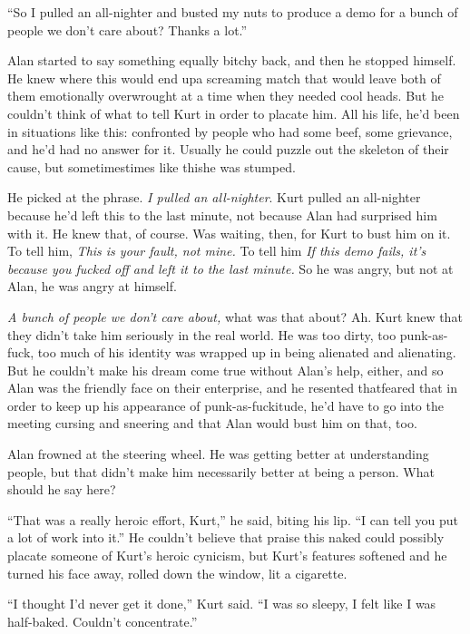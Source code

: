 ``So I pulled an all-nighter and busted my nuts to produce a demo for
a bunch of people we don't care about?  Thanks a lot.''

Alan started to say something equally bitchy back, and then he stopped
himself.  He knew where this would end up\dash{}a screaming match that
would leave both of them emotionally overwrought at a time when they
needed cool heads.  But he couldn't think of what to tell Kurt in
order to placate him.  All his life, he'd been in situations like
this:  confronted by people who had some beef, some grievance, and
he'd had no answer for it.  Usually he could puzzle out the skeleton
of their cause, but sometimes\dash{}times like this\dash{}he was stumped.

He picked at the phrase.  \textit{I pulled an all-nighter}.  Kurt
pulled an all-nighter because he'd left this to the last minute, not
because Alan had surprised him with it.  He knew that, of course.  Was
waiting, then, for Kurt to bust him on it.  To tell him, \textit{This
is your fault, not mine.} To tell him \textit{If this demo fails, it's
because you fucked off and left it to the last minute.} So he was
angry, but not at Alan, he was angry at himself.

\textit{A bunch of people we don't care about,} what was that about? 
Ah.  Kurt knew that they didn't take him seriously in the real world. 
He was too dirty, too punk-as-fuck, too much of his identity was
wrapped up in being alienated and alienating.  But he couldn't make
his dream come true without Alan's help, either, and so Alan was the
friendly face on their enterprise, and he resented that\dash{}feared that
in order to keep up his appearance of punk-as-fuckitude, he'd have to
go into the meeting cursing and sneering and that Alan would bust him
on that, too.

Alan frowned at the steering wheel.  He was getting better at
understanding people, but that didn't make him necessarily better at
being a person.  What should he say here?

``That was a really heroic effort, Kurt,'' he said, biting his lip. 
``I can tell you put a lot of work into it.'' He couldn't believe that
praise this naked could possibly placate someone of Kurt's heroic
cynicism, but Kurt's features softened and he turned his face away,
rolled down the window, lit a cigarette.

``I thought I'd never get it done,'' Kurt said.  ``I was so sleepy, I
felt like I was half-baked.  Couldn't concentrate.''

